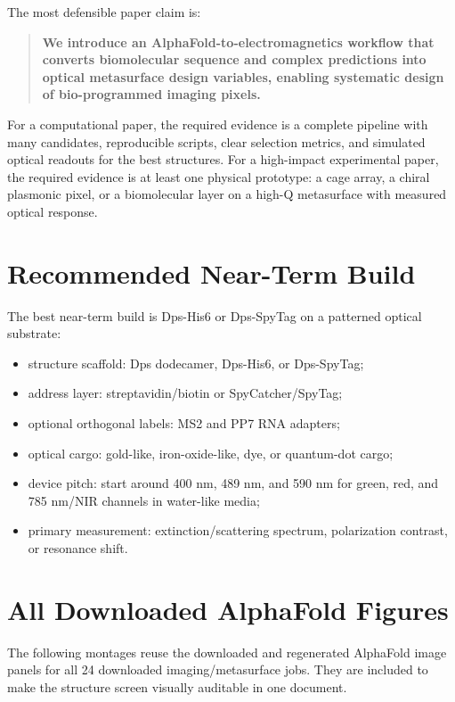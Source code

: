 \documentclass[11pt]{article}
\newcommand{\af}{AlphaFold}
\begin{document}
The most defensible paper claim is:

\begin{quote}
\textbf{We introduce an \af{}-to-electromagnetics workflow that converts biomolecular sequence and complex predictions into optical metasurface design variables, enabling systematic design of bio-programmed imaging pixels.}
\end{quote}

For a computational paper, the required evidence is a complete pipeline with many candidates, reproducible scripts, clear selection metrics, and simulated optical readouts for the best structures. For a high-impact experimental paper, the required evidence is at least one physical prototype: a cage array, a chiral plasmonic pixel, or a biomolecular layer on a high-Q metasurface with measured optical response.

\section{Recommended Near-Term Build}

The best near-term build is Dps-His6 or Dps-SpyTag on a patterned optical substrate:

\begin{itemize}
\item structure scaffold: Dps dodecamer, Dps-His6, or Dps-SpyTag;
\item address layer: streptavidin/biotin or SpyCatcher/SpyTag;
\item optional orthogonal labels: MS2 and PP7 RNA adapters;
\item optical cargo: gold-like, iron-oxide-like, dye, or quantum-dot cargo;
\item device pitch: start around 400 nm, 489 nm, and 590 nm for green, red, and 785 nm/NIR channels in water-like media;
\item primary measurement: extinction/scattering spectrum, polarization contrast, or resonance shift.
\end{itemize}

\clearpage
\appendix

\section{All Downloaded AlphaFold Figures}

The following montages reuse the downloaded and regenerated \af{} image panels for all 24 downloaded imaging/metasurface jobs. They are included to make the structure screen visually auditable in one document.
\end{document}
